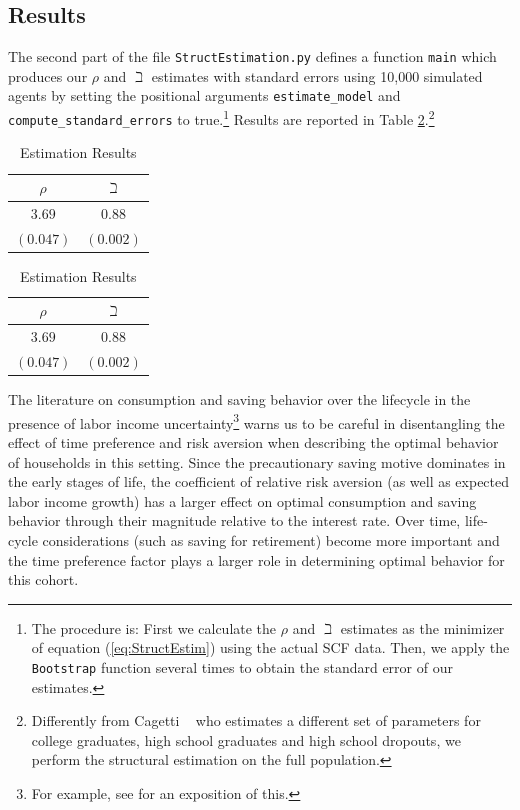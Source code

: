 \documentclass[titlepage, headings=optiontotocandhead]{econark}
\begin{document}
{\hypertarget{estimation-results}{}
\subsection{Results}
The second part of the file \texttt{StructEstimation.py}
defines a function \texttt{main} which produces our $\rho$ and
$\beth$ estimates with standard errors using 10,000 simulated
agents by setting the positional arguments \texttt{estimate\_model} and
\texttt{compute\_standard\_errors} to true.\footnote{The procedure is: First we calculate the $\rho$ and
  $\beth$ estimates as the minimizer of equation
  (\ref{eq:StructEstim}) using the actual SCF data. Then, we apply the
  \texttt{Bootstrap} function several times to obtain the standard
  error of our estimates.} Results are reported in Table
\ref{tab:EstResults}.\footnote{Differently from Cagetti
  ~\citeyearpar{cagettiWprofiles} who estimates a different set of
  parameters for college graduates, high school graduates and high
  school dropouts, we perform the structural estimation on
  the full population.}


  \begin{table}[h]
    \caption{Estimation Results}\label{tab:EstResults}
    \center
    \begin{tabular}{cc}
      \hline
      $\rho $ & $\beth$\\
      \hline
      $3.69$ & $0.88$\\
      $(0.047)$ & $(0.002)$\\
      \hline
    \end{tabular}
  \end{table}

  \begin{table}[h]
    \caption{Estimation Results}\label{tab:EstResults}
    \center
    \begin{tabular}{cc}
      \hline
      $\rho $ & $\beth$\\
      \hline
      $3.69$ & $0.88$\\
      $(0.047)$ & $(0.002)$\\
      \hline
    \end{tabular}
  \end{table}


The literature on consumption and saving behavior over the lifecycle in the presence of labor income uncertainty\footnote{For example, see \cite{gpLifecycle} for an exposition of this.} warns us to be careful in disentangling the effect of time preference and risk aversion when describing the optimal behavior of households in this setting.  Since the precautionary saving motive dominates in the early stages of life, the coefficient of relative risk aversion (as well as expected labor income growth) has a larger effect on optimal consumption and saving behavior through their magnitude relative to the interest rate. Over time, life-cycle considerations (such as saving for retirement) become more important and the time preference factor plays a larger role in determining optimal behavior for this cohort.

}
\end{document}
